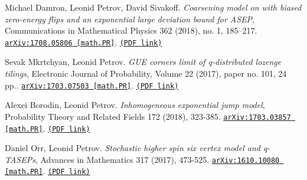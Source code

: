 \documentclass[letterpaper,11pt]{article}
\begin{document}
\begin{etaremune}
\item 
Michael Damron, Leonid Petrov, David Sivakoff.
\emph{Coarsening model on  with biased zero-energy flips and an exponential large deviation bound for ASEP}, Communications in Mathematical Physics 362 (2018), no. 1, 185–217. 
\href{https://arxiv.org/abs/1708.05806}{\texttt{arXiv:1708.05806 [math.PR]}}. \href{https://storage.lpetrov.cc/research_files/Petrov-publ/26-publ-petrov-uva.pdf}{\texttt{(PDF link)}}

















\item 
Sevak Mkrtchyan, Leonid Petrov.
\emph{GUE corners limit of q-distributed lozenge tilings}, Electronic Journal of Probability, Volume 22 (2017), paper no. 101, 24 pp.. 
\href{https://arxiv.org/abs/1703.07503}{\texttt{arXiv:1703.07503 [math.PR]}}. \href{https://storage.lpetrov.cc/research_files/Petrov-publ/25-publ-petrov-uva.pdf}{\texttt{(PDF link)}}



\item 
Alexei Borodin, Leonid Petrov.
\emph{Inhomogeneous exponential jump model}, Probability Theory and Related Fields 172 (2018), 323-385. 
\href{https://arxiv.org/abs/1703.03857}{\texttt{arXiv:1703.03857 [math.PR]}}. \href{https://storage.lpetrov.cc/research_files/Petrov-publ/24-publ-petrov-uva-j.pdf}{\texttt{(PDF link)}}

















\item 
Daniel Orr, Leonid Petrov.
\emph{Stochastic higher spin six vertex model and q-TASEPs}, Advances in Mathematics 317 (2017), 473-525. 
\href{https://arxiv.org/abs/1610.10080}{\texttt{arXiv:1610.10080 [math.PR]}}. \href{https://storage.lpetrov.cc/research_files/Petrov-publ/23-publ-petrov-uva.pdf}{\texttt{(PDF link)}}










\end{etaremune}
\end{document}
